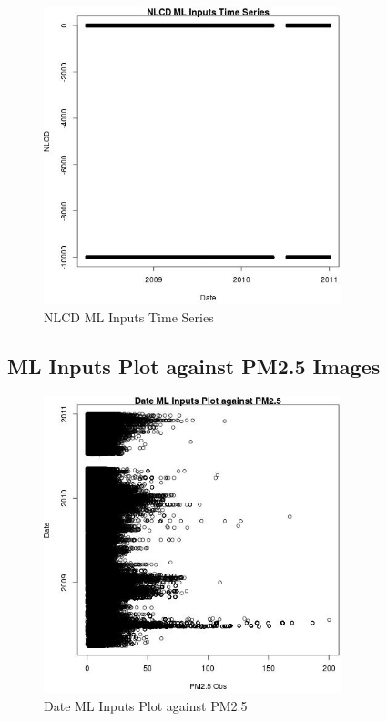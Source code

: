 \begin{figure} 
\centering  
\includegraphics[width=0.77\textwidth]{Code_Outputs/ML_input_report_ML_input_PM25_Step5_part_d_de_duplicated_aves_ML_input_NLCDvDate.jpg} 
\caption{\label{fig:ML_input_report_ML_input_PM25_Step5_part_d_de_duplicated_aves_ML_inputNLCDvDate}NLCD ML Inputs Time Series} 
\end{figure} 
 

\subsection{ML Inputs Plot against PM2.5 Images} 
 

\begin{figure} 
\centering  
\includegraphics[width=0.77\textwidth]{Code_Outputs/ML_input_report_ML_input_PM25_Step5_part_d_de_duplicated_aves_ML_input_DatevPM25_Obs.jpg} 
\caption{\label{fig:ML_input_report_ML_input_PM25_Step5_part_d_de_duplicated_aves_ML_inputDatevPM25_Obs}Date ML Inputs Plot against PM2.5} 
\end{figure} 
 

